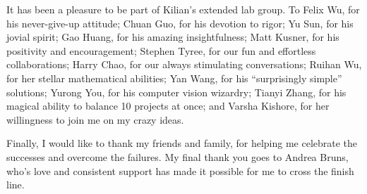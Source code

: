 It has been a pleasure to be part of Kilian's extended lab group.
To Felix Wu, for his never-give-up attitude; Chuan Guo, for his devotion to rigor; Yu Sun, for his jovial spirit; Gao Huang, for his amazing insightfulness;
Matt Kusner, for his positivity and encouragement; Stephen Tyree, for our fun and effortless collaborations;
Harry Chao, for our always stimulating conversations;
Ruihan Wu, for her stellar mathematical abilities;
Yan Wang, for his ``surprisingly simple'' solutions;
Yurong You, for his computer vision wizardry;
Tianyi Zhang, for his magical ability to balance 10 projects at once;
and Varsha Kishore, for her willingness to join me on my crazy ideas.

Finally, I would like to thank my friends and family, for helping me celebrate the successes and overcome the failures.
My final thank you goes to Andrea Bruns, who's love and consistent support has made it possible for me to cross the finish line.
